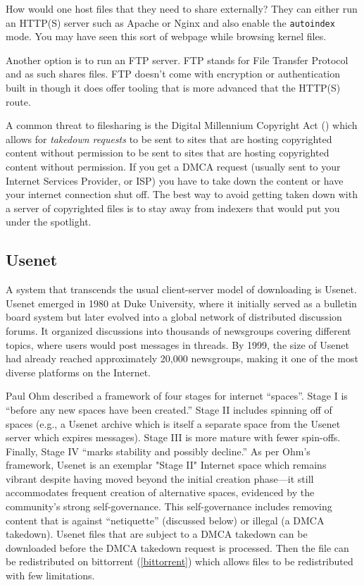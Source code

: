 How would one host files that they need to share externally? They can either run
an HTTP(S) server such as Apache or Nginx and also enable the \texttt{autoindex}
mode. You may have seen this sort of webpage while browsing kernel files.

Another option is to run an FTP server. FTP stands for File Transfer Protocol
and as such shares files. FTP doesn't come with encryption or authentication
built in though it does offer tooling that is more advanced that the HTTP(S)
route.

A common threat to filesharing is the Digital Millennium Copyright Act
(\cite{DigitalMillenniumCopyright2025}) which allows for \emph{takedown
      requests} to be sent to sites that are hosting copyrighted content without
permission to be sent to sites that are hosting copyrighted content without
permission. If you get a DMCA request (usually sent to your Internet Services
Provider, or ISP) you have to take down the content or have your internet
connection shut off. The best way to avoid getting taken down with a server of
copyrighted files is to stay away from indexers that would put you under the
spotlight.


\subsection{Usenet}

A system that transcends the usual client-server model of downloading is Usenet.
Usenet emerged in 1980 at Duke University, where it initially served as a
bulletin board system but later evolved into a global network of distributed
discussion forums.\cite{HowUseUsenet} It organized discussions into thousands of
newsgroups covering different topics, where users would post messages in
threads. By 1999, the size of Usenet had already reached approximately 20,000
newsgroups, making it one of the most diverse platforms on the Internet.

Paul Ohm described a framework of four stages for internet ``spaces''. Stage I
is ``before any new spaces have been created.'' Stage II includes spinning off
of spaces (e.g., a Usenet archive which is itself a separate space from the
Usenet server which expires messages). Stage III is more mature with fewer
spin-offs. Finally, Stage IV ``marks stability and possibly decline.'' As per
Ohm's framework, Usenet is an exemplar "Stage II" Internet space which remains
vibrant despite having moved beyond the initial creation phase---it still
accommodates frequent creation of alternative spaces, evidenced by the
community's strong self-governance.\cite{ohmRegulatingInternetUsenet1998} This
self-governance includes removing content that is against ``netiquette''
(discussed below) or illegal (a DMCA takedown). Usenet files that are subject to
a DMCA takedown can be downloaded before the DMCA takedown request is processed.
Then the file can be redistributed on bittorrent (\ref{bittorrent}) which allows
files to be redistributed with few limitations.


